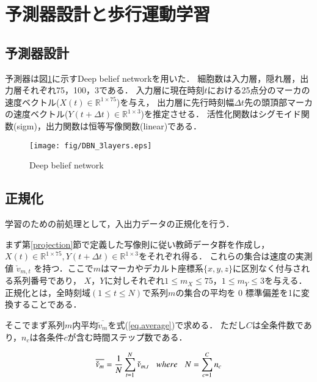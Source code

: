 \documentclass{sigchi}
\begin{document}
\section{予測器設計と歩行運動学習}%

\subsection{予測器設計}


予測器は図\ref{fig-dbn}に示すDeep belief networkを用いた．
細胞数は入力層，隠れ層，出力層それぞれ75，100，3である．
入力層に現在時刻$t$における25点分のマーカの速度ベクトル($X(t) \in \mathbb{R}^{1 \times 75}$)を与え，
出力層に先行時刻幅$\Delta t$先の頭頂部マーカの速度ベクトル($Y(t + \Delta t) \in \mathbb{R}^{1 \times 3}$)を推定させる．
活性化関数はシグモイド関数(sigm)，出力関数は恒等写像関数(linear)である．


\begin{figure}[tb]
  \begin{center}
    \texttt{[image: fig/DBN\_3layers.eps]}
  \end{center}
  \vspace*{-6mm}
  \caption{Deep belief network}
  \label{fig-dbn}
\end{figure}



\subsection{正規化}

学習のための前処理として，入出力データの正規化を行う．

まず第\ref{projection}節で定義した写像則に従い教師データ群を作成し，
$X(t) \in \mathbb{R}^{1 \times 75}, Y(t + \Delta t) \in \mathbb{R}^{1 \times 3}$をそれぞれ得る．
これらの集合は速度の実測値 $\check{v}_{m,t}$ を持つ．ここで$m$はマーカやデカルト座標系$\{ x, y, z\}$に区別なく付与される系列番号であり，
$X$，$Y$に対しそれぞれ$1 \leq m_X \leq 75$，$1 \leq m_Y \leq 3$を与える．
正規化とは，全時刻域$(1 \leq t \leq N)$で系列$m$の集合の平均を 0 標準偏差を1に変換することである．

そこでまず系列$m$内平均$\overline{\check{v}_{m}} $を式(\ref{eq.average})で求める．
ただし$C$は全条件数であり，$n_c$は各条件$c$が含む時間ステップ数である．

\begin{equation}
\overline{\check{v}_{m}} = \frac{1}{N}\sum^{N}_{t=1}\check{v}_{m,t} 
 \hspace{3mm} where  \hspace{3mm}
N=\sum^{C}_{c=1} n_c 
\label{eq.average}
\end{equation}
\end{document}
